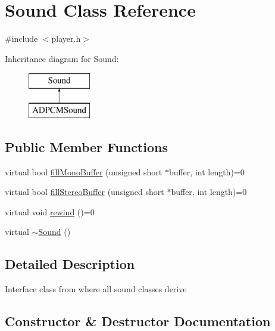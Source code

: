 \hypertarget{class_sound}{}\section{Sound Class Reference}
\label{class_sound}


{\ttfamily \#include $<$player.\+h$>$}

Inheritance diagram for Sound\+:\begin{figure}[H]
\begin{center}
\leavevmode
\includegraphics[height=2.000000cm]{class_sound}
\end{center}
\end{figure}
\subsection*{Public Member Functions}
\begin{DoxyCompactItemize}
\item 
virtual bool \hyperlink{class_sound_aa0068675e952893d2fdfef2503bcbc81}{fill\+Mono\+Buffer} (unsigned short $\ast$buffer, int length)=0
\item 
virtual bool \hyperlink{class_sound_ac514e0aa8963b40ddd328a9f79d0769b}{fill\+Stereo\+Buffer} (unsigned short $\ast$buffer, int length)=0
\item 
virtual void \hyperlink{class_sound_a1870e3d50f0f58fc98fd966372ce42f1}{rewind} ()=0
\item 
virtual \hyperlink{class_sound_a0907389078bf740be2a5763366ad3376}{$\sim$\+Sound} ()
\end{DoxyCompactItemize}


\subsection{Detailed Description}
Interface class from where all sound classes derive 

\subsection{Constructor \& Destructor Documentation}
\mbox{\label{class_sound_a0907389078bf740be2a5763366ad3376}} 

